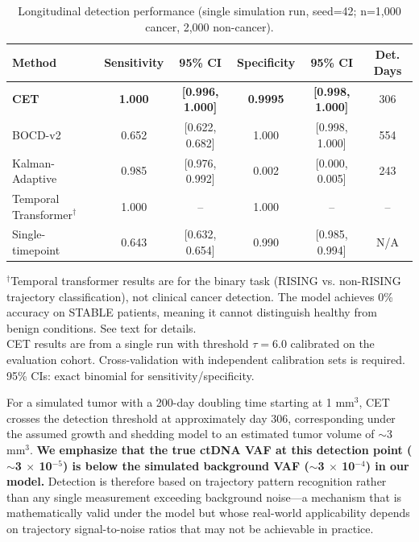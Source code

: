 \documentclass[10pt,a4paper]{article}
\begin{document}
\begin{table}[H]
\centering
\caption{Longitudinal detection performance (single simulation run, seed=42; n=1,000 cancer, 2,000 non-cancer).}
\label{tab:longitudinal_performance}
\begin{tabular}{l c c c c c}
\toprule
\textbf{Method} & \textbf{Sensitivity} & \textbf{95\% CI} & \textbf{Specificity} & \textbf{95\% CI} & \textbf{Det. Days} \\
\midrule
\textbf{CET} & \textbf{1.000} & \textbf{[0.996, 1.000]} & \textbf{0.9995} & \textbf{[0.998, 1.000]} & 306 \\
BOCD-v2 & 0.652 & [0.622, 0.682] & 1.000 & [0.998, 1.000] & 554 \\
Kalman-Adaptive & 0.985 & [0.976, 0.992] & 0.002 & [0.000, 0.005] & 243 \\
Temporal Transformer$^\dagger$ & 1.000 & -- & 1.000 & -- & -- \\
Single-timepoint & 0.643 & [0.632, 0.654] & 0.990 & [0.985, 0.994] & N/A \\
\bottomrule
\end{tabular}
\vspace{0.3cm}
\footnotesize{$^\dagger$Temporal transformer results are for the binary task (RISING vs. non-RISING trajectory classification), not clinical cancer detection. The model achieves 0\% accuracy on STABLE patients, meaning it cannot distinguish healthy from benign conditions. See text for details.} \\
\footnotesize{CET results are from a single run with threshold $\tau=6.0$ calibrated on the evaluation cohort. Cross-validation with independent calibration sets is required. 95\% CIs: exact binomial for sensitivity/specificity.}
\end{table}

For a simulated tumor with a 200-day doubling time starting at 1 mm$^3$, CET crosses the detection threshold at approximately day 306, corresponding under the assumed growth and shedding model to an estimated tumor volume of $\sim$3 mm$^3$. \textbf{We emphasize that the true ctDNA VAF at this detection point ($\sim$3 $\times$ 10$^{-5}$) is below the simulated background VAF ($\sim$3 $\times$ 10$^{-4}$) in our model.} Detection is therefore based on trajectory pattern recognition rather than any single measurement exceeding background noise—a mechanism that is mathematically valid under the model but whose real-world applicability depends on trajectory signal-to-noise ratios that may not be achievable in practice.
\end{document}
